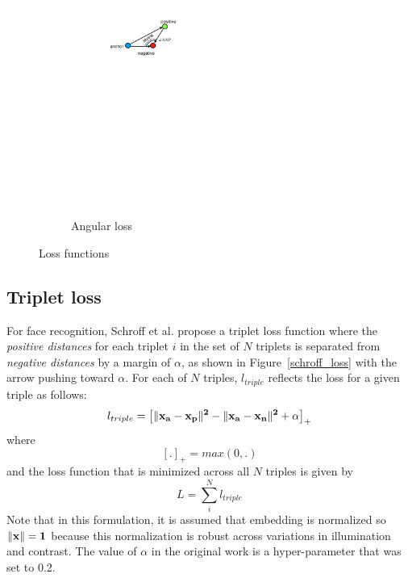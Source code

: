 \begin{figure}[htb]
\begin{subfigure}[t]{0.31\linewidth}
        \includegraphics[width=\linewidth]{angular_loss}
        \caption{Angular loss}
        \label{angular_loss}
    \end{subfigure}
    \caption{Loss functions}
\end{figure}

\subsection{Triplet loss}

For face recognition, Schroff et al. \cite{DBLP:conf/cvpr/SchroffKP15}
propose a triplet loss function where the \textit{positive distances}
for each triplet $i$ in the set of $N$ triplets is separated from
\textit{negative distances} by a margin of $\alpha$, as shown in
Figure~\ref{schroff_loss} with the arrow pushing toward $\alpha$.  For
each of $N$ triples, $l_{triple}$ reflects the loss for a given triple
as follows: 
\begin{equation}
  l_{triple} =  \left[\|\bf{x_a} - \bf{x_p}\|^2 - \|\bf{x_a} -\bf{x_n}\|^2 + \alpha \right]_+
\label{schroff}
\end{equation}
where
\begin{equation}
 \left[.\right]_{+} = max(0, .)
\end{equation}
and the loss function that is minimized across all $N$ triples is given by
\begin{equation}
 L = \sum_{i}^{N} l_{triple}
\end{equation}
Note that in this formulation, it is assumed that embedding is normalized so $\|\bf{x} \| = 1$ because this normalization is robust across variations in illumination and contrast.  The value of $\alpha$ in the original work is a hyper-parameter that \cite{DBLP:conf/cvpr/SchroffKP15} was set to 0.2.

